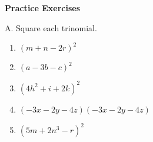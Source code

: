 \textbf{Practice Exercises}

\vspce

A. Square each trinomial.   
\begin{enumerate}
\item \hspce $(m + n - 2r)^{2}$
\item \hspce $(a - 3b - c)^{2}$
\item \hspce $(4h^{2} + i + 2k)^{2}$
\item \hspce $(-3x - 2y - 4z)(-3x - 2y - 4z)$
\item \hspce $(5m + 2n^{3} - r)^{2}$
\end{enumerate}